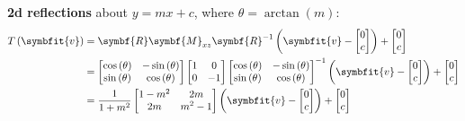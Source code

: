 \documentclass{article}
\begin{document}
\begin{minipage}[t]{126.1962963mm}
    \textbf{2d reflections} about \(y=mx + c\), where \(\theta=\arctan{\left( m \right)}\):
    \begin{align*}
        T\left( \symbfit{v} \right) & = \symbf{R} \symbf{M}_{xz} \symbf{R}^{-1} \left( \symbfit{v} - \begin{bmatrix} 0 \\ c \end{bmatrix} \right) + \begin{bmatrix} 0 \\ c \end{bmatrix} \\
                                    & =
        \begin{bmatrix}
            \cos{\left( \theta \right)} & -\sin{\left( \theta \right)} \\
            \sin{\left( \theta \right)} & \cos{\left( \theta \right)}
        \end{bmatrix}
        \begin{bmatrix}
            1 & 0  \\
            0 & -1
        \end{bmatrix}
        \begin{bmatrix}
            \cos{\left( \theta \right)} & -\sin{\left( \theta \right)} \\
            \sin{\left( \theta \right)} & \cos{\left( \theta \right)}
        \end{bmatrix}^{-1} \left( \symbfit{v} - \begin{bmatrix} 0 \\ c \end{bmatrix} \right) +
        \begin{bmatrix} 0 \\ c \end{bmatrix}                                                                                                                                               \\
                                    & = \frac{1}{1+m^2}
        \begin{bmatrix}
            1-m^2 & 2m    \\
            2m    & m^2-1
        \end{bmatrix} \left( \symbfit{v} - \begin{bmatrix} 0 \\ c \end{bmatrix} \right) +
        \begin{bmatrix} 0 \\ c \end{bmatrix}                                                                                                                                               \\
    \end{align*}
    \begin{multicols*}{2}

\end{multicols*}
\end{minipage}
\end{document}
